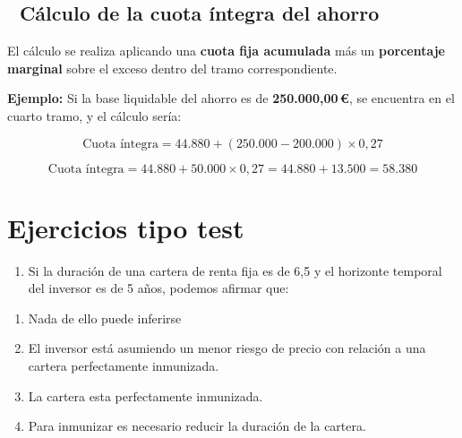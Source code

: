 \documentclass[
  letterpaper,
  DIV=11,
  numbers=noendperiod]{scrreprt}
\providecommand{\tightlist}{%
  \setlength{\itemsep}{0pt}\setlength{\parskip}{0pt}}\usepackage{longtable,booktabs,array}
\begin{document}
\begin{tcolorbox}
\begin{tcolorbox}
\end{tcolorbox}

\subsection{🧮 Cálculo de la cuota íntegra del
ahorro}\label{cuxe1lculo-de-la-cuota-uxedntegra-del-ahorro}

El cálculo se realiza aplicando una \textbf{cuota fija acumulada} más un
\textbf{porcentaje marginal} sobre el exceso dentro del tramo
correspondiente.

\textbf{Ejemplo:} Si la base liquidable del ahorro es de
\textbf{250.000,00\,€}, se encuentra en el cuarto tramo, y el cálculo
sería:

\[
\text{Cuota íntegra} = 44.880 + (250.000 - 200.000) \times 0,27
\]

\[
\text{Cuota íntegra} = 44.880 + 50.000 \times 0,27 = 44.880 + 13.500 = 58.380
\]

\section{Ejercicios tipo test}\label{ejercicios-tipo-test}

\begin{enumerate}
\def\labelenumi{\arabic{enumi}.}
\tightlist
\item
  Si la duración de una cartera de renta fija es de 6,5 y el horizonte
  temporal del inversor es de 5 años, podemos afirmar que:
\end{enumerate}

\begin{enumerate}
\def\labelenumi{\alph{enumi}.}
\item
  Nada de ello puede inferirse
\item
  El inversor está asumiendo un menor riesgo de precio con relación a
  una cartera perfectamente inmunizada.
\item
  La cartera esta perfectamente inmunizada.
\item
  Para inmunizar es necesario reducir la duración de la cartera.
\end{enumerate}

\begin{tcolorbox}[enhanced jigsaw, toprule=.15mm, left=2mm, arc=.35mm, breakable, bottomrule=.15mm, opacityback=0, rightrule=.15mm, leftrule=.75mm, colframe=quarto-callout-note-color-frame, colback=white]
\begin{minipage}[t]{5.5mm}
\textcolor{quarto-callout-note-color}{\faInfo}
\end{minipage}%
\begin{minipage}[t]{\textwidth - 5.5mm}


\end{minipage}
\end{tcolorbox}
\end{tcolorbox}
\end{document}
